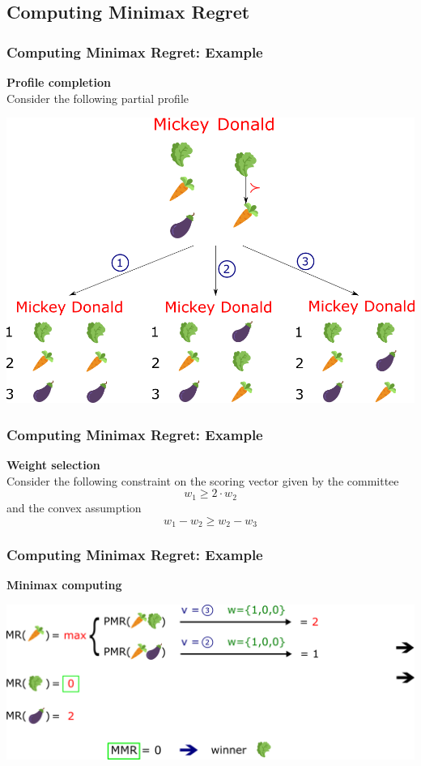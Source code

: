 \documentclass{beamer}
\begin{document}
\subsection{Computing Minimax Regret}
\begin{frame}[t]
	\frametitle{Computing Minimax Regret: Example}
	\textbf{Profile completion}\\
	Consider the following partial profile
	\begin{center}
		\includegraphics[scale=0.33]{compl.png}
	\end{center}
\end{frame}
\begin{frame}[t]
	\frametitle{Computing Minimax Regret: Example}
	\textbf{Weight selection} \\ \bigskip
	Consider the following constraint on the scoring vector given by the committee
	\[w_1 \geq 2 \cdot w_2\]
	and the convex assumption
	\[w_1 - w_2 \geq w_2 - w_3 \]

\end{frame}
\begin{frame}[t]
	\frametitle{Computing Minimax Regret: Example}
	\textbf{Minimax computing}\\
	\begin{center}
		\includegraphics[scale=0.35]{minmax.png}
	\end{center}
\end{frame}
\end{document}
